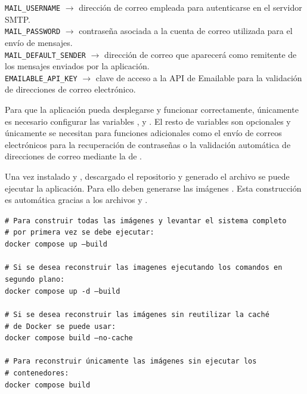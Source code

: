 \begin{tcolorbox}[
	colback=yellow!8,
	colframe=orange!60!black,
	title=secret.env,
	fonttitle=\bfseries,
	breakable
]
{		\texttt{MAIL\_USERNAME} $\rightarrow$ dirección de correo empleada para autenticarse en el servidor SMTP.\\
		
		\texttt{MAIL\_PASSWORD} $\rightarrow$ contraseña asociada a la cuenta de correo utilizada para el envío de mensajes.\\
		
		\texttt{MAIL\_DEFAULT\_SENDER} $\rightarrow$ dirección de correo que aparecerá como remitente de los mensajes enviados por la aplicación.\\
		
		\texttt{EMAILABLE\_API\_KEY} $\rightarrow$ clave de acceso a la API de Emailable para la validación de direcciones de correo electrónico.
	}
\end{tcolorbox}

Para que la aplicación pueda desplegarse y funcionar correctamente, únicamente es necesario configurar las variables ,  y . El resto de variables son opcionales y únicamente se necesitan para funciones adicionales como el envío de correos electrónicos para la recuperación de contraseñas o la validación automática de direcciones de correo mediante la  de .

Una vez instalado  y , descargado el repositorio y generado el archivo  se puede ejecutar la aplicación. Para ello deben generarse las imágenes . Esta construcción es automática gracias a los archivos  y .

\begin{tcolorbox}[
	colback=black!3,
	colframe=black!30,
	boxrule=0.5pt,
	arc=2mm,
	title= Terminal,
	fonttitle=\bfseries,
	breakable 
]
	{\footnotesize
		\noindent
		\texttt{\# Para construir todas las imágenes y levantar el sistema completo} \\
		\texttt{\# por primera vez se debe ejecutar: }\\
		\texttt{docker compose up --build}\\
		\\
		\texttt{\# Si se desea reconstruir las imagenes ejecutando los comandos en segundo plano:}\\
		\texttt{docker compose up -d --build}\\
		\\
		\texttt{\# Si se desea reconstruir las imágenes sin reutilizar la caché}\\
		\texttt{\# de Docker se puede usar:}\\
		\texttt{docker compose build --no-cache}\\
		\\
		\texttt{\# Para reconstruir únicamente las imágenes sin ejecutar los}\\
		\texttt{\# contenedores:}\\
		\texttt{docker compose build}
	}
\end{tcolorbox}

